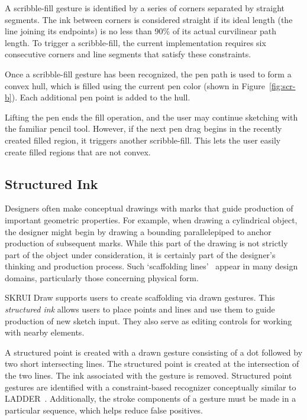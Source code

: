 \documentclass{egpubl}
\begin{document}
A scribble-fill gesture is identified by a series of corners separated
by straight segments. The ink between corners is considered straight
if its ideal length (the line joining its endpoints) is no less than
90\% of its actual curvilinear path length. To trigger a
scribble-fill, the current implementation requires six consecutive
corners and line segments that satisfy these constraints. 

Once a scribble-fill gesture has been recognized, the pen path is used
to form a convex hull, which is filled using the current pen color
(shown in Figure~\ref{fig:scr-b}). Each additional pen point is added
to the hull.

Lifting the pen ends the fill operation, and the user may continue
sketching with the familiar pencil tool. However, if the next pen drag
begins in the recently created filled region, it triggers another
scribble-fill. This lets the user easily create filled regions that
are not convex.

\subsection{Structured Ink}

Designers often make conceptual drawings with marks that guide
production of important geometric properties. For example, when
drawing a cylindrical object, the designer might begin by drawing a
bounding parallelepiped to anchor production of subsequent marks. While
this part of the drawing is not strictly part of the object under
consideration, it is certainly part of the designer's thinking and
production process. Such `scaffolding lines'~\cite{company-modes}
appear in many design domains, particularly those concerning physical
form.

SKRUI Draw supports users to create scaffolding via drawn
gestures. This \emph{structured ink} allows users to place points and
lines and use them to guide production of new sketch input. They also
serve as editing controls for working with nearby elements.

A structured point is created with a drawn gesture consisting of a dot
followed by two short intersecting lines. The structured point is
created at the intersection of the two lines. The ink associated with
the gesture is removed. Structured point gestures are identified with
a constraint-based recognizer conceptually similar to
LADDER~\cite{hammond-ladder}. Additionally, the stroke components of a
gesture must be made in a particular sequence, which helps reduce
false positives.
\end{document}
